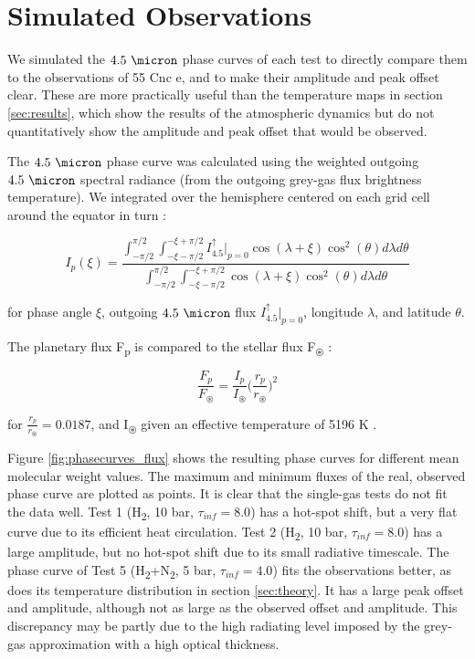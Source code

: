
\section{Simulated Observations}


We simulated the $4.5\ \micron$ phase curves of each test to directly compare them to the observations of 55 Cnc e, and to make their amplitude and peak offset clear. These are more practically useful than the temperature maps in section \ref{sec:results}, which show the results of the atmospheric dynamics but do not quantitatively show the amplitude and peak offset that would be observed.

The $4.5\ \micron$ phase curve was calculated using the weighted outgoing $4.5\ \micron$ spectral radiance (from the outgoing grey-gas flux brightness temperature). We integrated over the hemisphere centered on each grid cell around the equator in turn \citep{cowan2008inverting}:

\begin{equation}
  I_{p}(\xi) = \frac{\int_{-\pi/2}^{\pi/2} \int_{-\xi-\pi/2}^{-\xi+\pi/2}I_{4.5}^{\uparrow}|_{p=0}\cos(\lambda+\xi)\cos^{2}(\theta)d \lambda d \theta}{\int_{-\pi/2}^{\pi/2} \int_{-\xi-\pi/2}^{-\xi+\pi/2}\cos(\lambda+\xi)\cos^{2}(\theta)d \lambda d \theta}
\end{equation}

for phase angle $\xi$, outgoing $4.5\ \micron$ flux $I_{4.5}^{\uparrow}|_{p=0}$, longitude $\lambda$, and latitude $\theta$.

The planetary flux F\textsubscript{p} is compared to the stellar flux F\textsubscript{$\circledast$} \citep{crossfield2012acme}:

\begin{equation}
  \frac{F_{p}}{F_{\circledast}} = \frac{I_{p}}{I_{\circledast}}\Big( \frac{r_{p}}{r_{\circledast}} \Big) ^{2}
\end{equation}

for $\frac{r_{p}}{r_{\circledast}} = 0.0187$, and I\textsubscript{$\circledast$} given an effective temperature of 5196 K \citep{von201155}.

Figure \ref{fig:phasecurves_flux} shows the resulting phase curves for different mean molecular weight values. The maximum and minimum fluxes of the real, observed phase curve are plotted as points. It is clear that the single-gas tests do not fit the data well. Test 1 (H\textsubscript{2}, 10 bar, $\tau_{inf} = 8.0$) has a hot-spot shift, but a very flat curve due to its efficient heat circulation. Test 2 (H\textsubscript{2}, 10 bar, $\tau_{inf} = 8.0$) has a large amplitude, but no hot-spot shift due to its small radiative timescale. The phase curve of Test 5 (H\textsubscript{2}+N\textsubscript{2}, 5 bar, $\tau_{inf} = 4.0$) fits the observations better, as does its temperature distribution in section \ref{sec:theory}. It has a large peak offset and amplitude, although not as large as the observed offset and amplitude. This discrepancy may be partly due to the high radiating level imposed by the grey-gas approximation with a high optical thickness.

